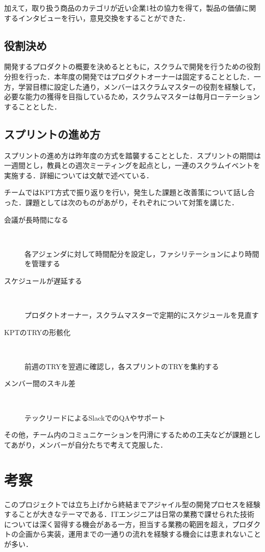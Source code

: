 \documentclass[fontsize=9pt, jafontscale=.95, twocolumn, a4paper]{jlreq}
\begin{document}
加えて，取り扱う商品のカテゴリが近い企業1社の協力を得て，製品の価値に関するインタビューを行い，意見交換をすることができた．

\subsection{役割決め}
\label{sec:org32a315d}

開発するプロダクトの概要を決めるとともに，スクラムで開発を行うための役割分担を行った．本年度の開発ではプロダクトオーナーは固定することとした．一方，学習目標に設定した通り，メンバーはスクラムマスターの役割を経験して，必要な能力の獲得を目指しているため，スクラムマスターは毎月ローテーションすることとした．

\subsection{スプリントの進め方}
\label{sec:orgea59ba2}

スプリントの進め方は昨年度の方式を踏襲することとした．スプリントの期間は一週間とし，教員との週次ミーティングを起点とし，一連のスクラムイベントを実施する．詳細については文献\cite{中鉢2209}で述べている．

チームではKPT方式で振り返りを行い，発生した課題と改善策について話し合った．課題としては次のものがあがり，それぞれについて対策を講じた．

\begin{description} %
\item[{会議が長時間になる}]　

各アジェンダに対して時間配分を設定し，ファシリテーションにより時間を管理する
\item[{スケジュールが遅延する}]　

プロダクトオーナー，スクラムマスターで定期的にスケジュールを見直す
\item[{KPTのTRYの形骸化}]　

前週のTRYを翌週に確認し，各スプリントのTRYを集約する
\item[{メンバー間のスキル差}]　

テックリードによるSlackでのQAやサポート
\end{description}

その他，チーム内のコミュニケーションを円滑にするための工夫などが課題としてあがり，メンバーが自分たちで考えて克服した．

\section{考察}
\label{sec:org365d5f3}
このプロジェクトでは立ち上げから終結までアジャイル型の開発プロセスを経験することが大きなテーマである．ITエンジニアは日常の業務で課せられた技術については深く習得する機会がある一方，担当する業務の範囲を超え，プロダクトの企画から実装，運用までの一通りの流れを経験する機会には恵まれないことが多い．
\end{document}

